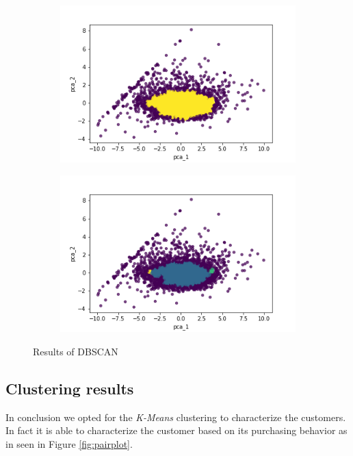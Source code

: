 \begin{figure}[h!]
	\captionsetup{justification=centering}
	\centering
	\begin{subfigure}{0.49\textwidth}
		\includegraphics[width=.65\textwidth]{img/clustering/dbscan.png}
		\centering
		\label{fig:dbscan_good}
	\end{subfigure}
	\begin{subfigure}{0.49\textwidth}
		\includegraphics[width=.65\textwidth]{img/clustering/dbscan_bad.png}
		\centering
		\label{fig:dbscan_bad}
	\end{subfigure}
	\caption{Results of DBSCAN}
	\label{fig:dbscan}
\end{figure}

\subsection{Clustering results}

In conclusion we opted for the \emph{K-Means} clustering to characterize the customers. In fact it is able to characterize the customer based on its purchasing behavior as in seen in Figure \ref{fig:pairplot}.

